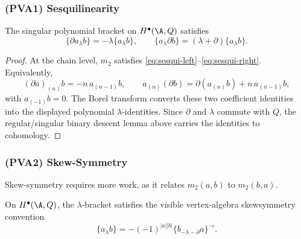 \subsubsection{(PVA1) Sesquilinearity}

\begin{proposition}
The singular polynomial bracket on \(H^\bullet(\A,Q)\) satisfies
\[
\{\partial a_\lambda b\}=-\lambda\{a_\lambda b\},
\qquad
\{a_\lambda\partial b\}=(\lambda+\partial)\{a_\lambda b\}.
\]
\end{proposition}

\begin{proof}
At the chain level, \(m_2\) satisfies
\eqref{eq:sesqui-left}--\eqref{eq:sesqui-right}.  Equivalently,
\[
(\partial a)_{(n)}b=-n\,a_{(n-1)}b,\qquad
a_{(n)}(\partial b)=\partial(a_{(n)}b)+n\,a_{(n-1)}b,
\]
with \(a_{(-1)}b=0\). The Borel transform converts these two
coefficient identities into the displayed polynomial
\(\lambda\)-identities.  Since \(\partial\) and \(\lambda\) commute
with \(Q\), the regular/singular binary descent lemma above carries
the identities to cohomology.
\end{proof}

\subsubsection{(PVA2) Skew-Symmetry}

Skew-symmetry requires more work, as it relates $m_2(a,b)$ to $m_2(b,a)$.

\begin{proposition}
On $H^\bullet(\A,Q)$, the $\lambda$-bracket satisfies the visible
vertex-algebra skewsymmetry convention
\[
\{a_\lambda b\}
= -(-1)^{|a||b|}\{b_{-\lambda-\partial}a\}^{\to}.
\]
\end{proposition}

